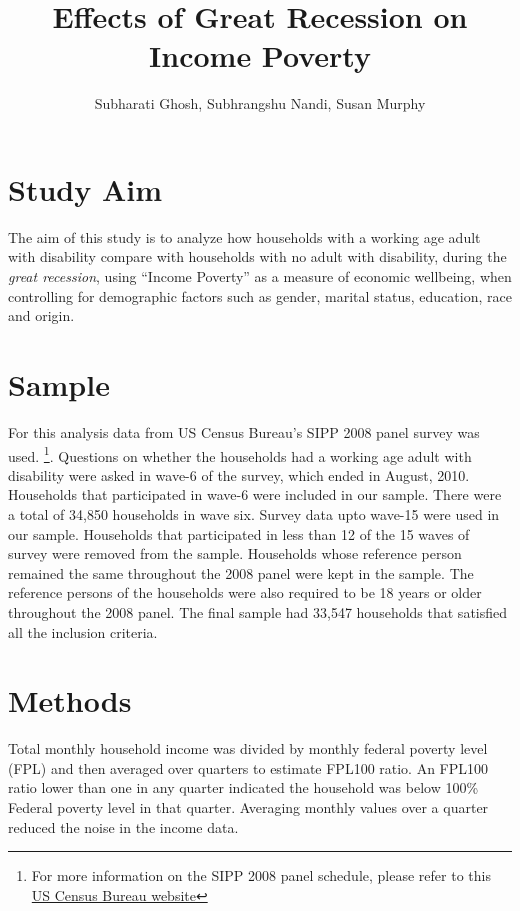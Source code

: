 \documentclass[11pt]{extarticle} %
\begin{document}

\title{Effects of Great Recession on Income Poverty}
\author{Subharati Ghosh, Subhrangshu Nandi, Susan Murphy \\
\date{}
}

\maketitle

\section{Study Aim}
The aim of this study is to analyze how households with a working age adult with disability compare with households with no adult with disability, during the {\emph{great recession}}, using ``Income Poverty'' as a measure of economic wellbeing, when controlling for demographic factors such as gender, marital status, education, race and origin. 

\section{Sample}
For this analysis data from US Census Bureau's SIPP 2008 panel survey was used. {\footnote{For more information on the SIPP 2008 panel schedule, please refer to this \href{http://www.census.gov/programs-surveys/sipp/data/2008-panel.html}{US Census Bureau website}}}. Questions on whether the households had a working age adult with disability were asked in wave-6 of the survey, which ended in August, 2010. Households that participated in wave-6 were included in our sample. There were a total of 34,850 households in wave six. Survey data upto wave-15 were used in our sample. Households that participated in less than 12 of the 15 waves of survey were removed from the sample. Households whose reference person remained the same throughout the 2008 panel were kept in the sample. The reference persons of the households were also required to be 18 years or older throughout the 2008 panel. The final sample had 33,547 households that satisfied all the inclusion criteria. 

\section{Methods}
Total monthly household income was divided by monthly federal poverty level (FPL) and then averaged over quarters to estimate FPL100 ratio. An FPL100 ratio lower than one in any quarter indicated the household was below 100\% Federal poverty level in that quarter. Averaging monthly values over a quarter reduced the noise in the income data. 
\end{document}
